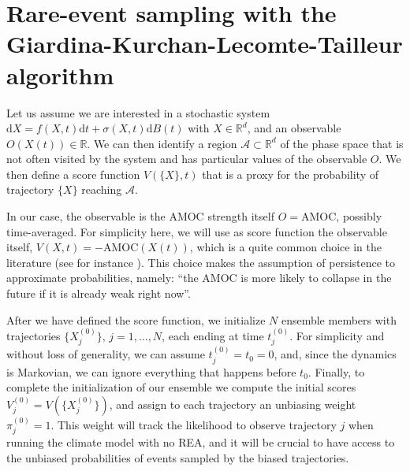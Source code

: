 \section{Rare-event sampling with the Giardina-Kurchan-Lecomte-Tailleur algorithm}\label{AppREA}

Let us assume we are interested in a stochastic system $\text{d} X = f(X, t) \text{d} t + \sigma(X, t) \text{d} B(t)$ with $X \in \mathbb{R}^d$, and an observable $O(X(t)) \in \mathbb{R}$. We can then identify a region $\mathcal{A} \subset \mathbb{R}^d$ of the phase space that is not often visited by the system and has particular values of the observable $O$.
We then define a score function $V(\{X\}, t)$ that is a proxy for the probability of trajectory $\{X\}$ reaching $\mathcal{A}$.

In our case, the observable is the AMOC strength itself $O = \mathrm{AMOC}$, possibly time-averaged. For simplicity here, we will use as score function the observable itself, $V({X}, t) = -\mathrm{AMOC}(X(t))$, which is a quite common choice in the literature (see for instance \cite{GKTL-Ly,Ragone24}). This choice makes the assumption of persistence to approximate probabilities, namely: ``the AMOC is more likely to collapse in the future if it is already weak right now''.

After we have defined the score function, we initialize $N$ ensemble members with trajectories $\{X^{(0)}_j\}, \, j = 1, \ldots, N$, each ending at time $t^{(0)}_j$. For simplicity and without loss of generality, we can assume $t^{(0)}_j = t_0 = 0$, and,
since the dynamics is Markovian, we can ignore everything that happens before $t_0$.
Finally, to complete the initialization of our ensemble we compute the initial scores $V_j^{(0)} = V(\{X^{(0)}_j\})$, and assign to each trajectory an unbiasing weight $\pi_j^{(0)} = 1$. This weight will track the likelihood to observe trajectory $j$ when running the climate model with no REA, and it will be crucial to have access to the unbiased probabilities of events sampled by the biased trajectories.

